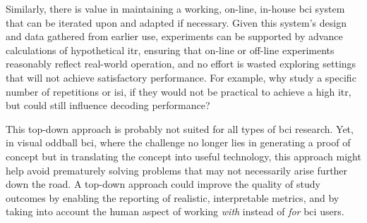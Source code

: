 Similarly, there is value in maintaining a working, on-line, in-house \ac{bci}
system that can be iterated upon and adapted if necessary.
Given this system's design and data gathered from earlier use, experiments can
be supported by advance calculations of hypothetical
\ac{itr}, ensuring that on-line or off-line experiments reasonably reflect
real-world operation, and no effort is wasted exploring settings that will not
achieve satisfactory performance.
For example, why study a specific number of repetitions or \ac{isi}, if they
would not be practical to achieve a high \ac{itr}, but could still influence
decoding performance?

This top-down approach is probably not suited for all types of \ac{bci}
research.
Yet, in visual oddball \ac{bci}, where the challenge no longer lies in generating
a proof of concept but in translating the concept into useful technology, this
approach might help avoid prematurely solving problems that may not necessarily
arise further down the road.
A top-down approach could improve the quality of study outcomes by enabling the
reporting of realistic, interpretable metrics,
and by taking into account the human aspect of working \emph{with} instead of
\emph{for} \ac{bci} users.
